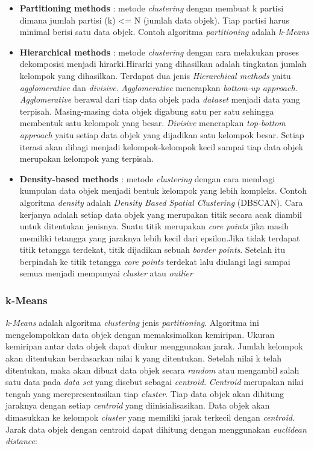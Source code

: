 \begin{itemize}

\item \textbf{Partitioning methods} : metode \textit{clustering} dengan membuat k partisi dimana jumlah partisi (k) <= N (jumlah data objek). Tiap partisi harus minimal berisi satu data objek. Contoh algoritma \textit{partitioning} adalah \textit{k-Means} 

\item \textbf{Hierarchical methods} : metode \textit{clustering} dengan cara melakukan proses dekomposisi menjadi hirarki.Hirarki yang dihasilkan adalah tingkatan jumlah kelompok yang dihasilkan. Terdapat dua jenis \textit{Hierarchical methods} yaitu \textit{agglomerative} dan \textit{divisive}. \textit{Agglomerative} menerapkan \textit{bottom-up approach}. \textit{Agglomerative} berawal dari tiap data objek pada \textit{dataset} menjadi data yang terpisah. Masing-masing data objek digabung satu per satu sehingga membentuk satu kelompok yang besar. \textit{Divisive} menerapkan \textit{top-bottom approach} yaitu setiap data objek yang dijadikan satu kelompok besar. Setiap iterasi akan dibagi menjadi kelompok-kelompok kecil sampai tiap data objek merupakan kelompok yang terpisah.

\item \textbf{Density-based methods} : metode \textit{clustering} dengan cara membagi kumpulan data objek menjadi bentuk kelompok yang lebih kompleks. Contoh algoritma \textit{density} adalah \textit{Density Based Spatial Clustering} (DBSCAN). Cara kerjanya adalah setiap data objek yang merupakan titik secara acak diambil  untuk ditentukan jenisnya. Suatu titik merupakan \textit{core points} jika masih memiliki tetangga yang jaraknya lebih kecil dari epsilon.Jika tidak terdapat titik tetangga terdekat, titik dijadikan sebuah \textit{border points}. Setelah itu berpindah ke titik tetangga \textit{core points} terdekat lalu diulangi lagi sampai semua menjadi mempunyai \textit{cluster} atau \textit{outlier}
\end{itemize}

\subsubsection{k-Means}
\textit{k-Means} adalah algoritma \textit{clustering} jenis \textit{partitioning}. Algoritma ini mengelompokkan data objek dengan memaksimalkan kemiripan. Ukuran kemiripan antar data objek dapat diukur menggunakan jarak. Jumlah kelompok akan ditentukan berdasarkan nilai k yang ditentukan. Setelah nilai k telah ditentukan, maka akan dibuat data objek secara \textit{random} atau mengambil salah satu data pada \textit{data set} yang disebut sebagai \textit{centroid}. \textit{Centroid} merupakan nilai tengah yang merepresentasikan tiap \textit{cluster}. Tiap data objek akan dihitung jaraknya dengan setiap \textit{centroid} yang diinisialisasikan. Data objek akan dimasukkan ke kelompok \textit{cluster} yang memiliki jarak terkecil dengan \textit{centroid}. Jarak data objek dengan centroid dapat dihitung dengan menggunakan \textit{euclidean distance}: 

